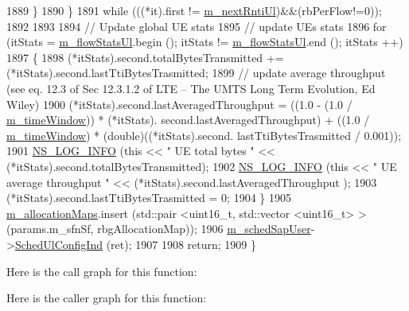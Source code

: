 \begin{DoxyCode}
1889         \}
1890     \}
1891   \textcolor{keywordflow}{while} (((*it).first != \hyperlink{classns3_1_1PfFfMacScheduler_ad4bed67ae396b364734c2cc0acc7e2ec}{m\_nextRntiUl})&&(rbPerFlow!=0));
1892 
1893 
1894   \textcolor{comment}{// Update global UE stats}
1895   \textcolor{comment}{// update UEs stats}
1896   \textcolor{keywordflow}{for} (itStats = \hyperlink{classns3_1_1PfFfMacScheduler_a1c3919a5dcda7ca29e667e2bca774ca5}{m\_flowStatsUl}.begin (); itStats != \hyperlink{classns3_1_1PfFfMacScheduler_a1c3919a5dcda7ca29e667e2bca774ca5}{m\_flowStatsUl}.end (); itStats
      ++)
1897     \{
1898       (*itStats).second.totalBytesTransmitted += (*itStats).second.lastTtiBytesTrasmitted;
1899       \textcolor{comment}{// update average throughput (see eq. 12.3 of Sec 12.3.1.2 of LTE – The UMTS Long Term Evolution, Ed
       Wiley)}
1900       (*itStats).second.lastAveragedThroughput = ((1.0 - (1.0 / \hyperlink{classns3_1_1PfFfMacScheduler_aaa362a4608a53cc70f16fdfedf221bd4}{m\_timeWindow})) * (*itStats).
      second.lastAveragedThroughput) + ((1.0 / \hyperlink{classns3_1_1PfFfMacScheduler_aaa362a4608a53cc70f16fdfedf221bd4}{m\_timeWindow}) * (double)((*itStats).second.
      lastTtiBytesTrasmitted / 0.001));
1901       \hyperlink{group__logging_gafbd73ee2cf9f26b319f49086d8e860fb}{NS\_LOG\_INFO} (\textcolor{keyword}{this} << \textcolor{stringliteral}{" UE total bytes "} << (*itStats).second.totalBytesTransmitted);
1902       \hyperlink{group__logging_gafbd73ee2cf9f26b319f49086d8e860fb}{NS\_LOG\_INFO} (\textcolor{keyword}{this} << \textcolor{stringliteral}{" UE average throughput "} << (*itStats).second.lastAveragedThroughput
      );
1903       (*itStats).second.lastTtiBytesTrasmitted = 0;
1904     \}
1905   \hyperlink{classns3_1_1PfFfMacScheduler_a372b18540784762ebc10292caf8ca40f}{m\_allocationMaps}.insert (std::pair <uint16\_t, std::vector <uint16\_t> > (params.m\_sfnSf, 
      rbgAllocationMap));
1906   \hyperlink{classns3_1_1PfFfMacScheduler_a16d9c49b69668f9343e9e7409179b8ae}{m\_schedSapUser}->\hyperlink{classns3_1_1FfMacSchedSapUser_a1b89636256701a84d990db7db8aea874}{SchedUlConfigInd} (ret);
1907 
1908   \textcolor{keywordflow}{return};
1909 \}
\end{DoxyCode}


Here is the call graph for this function\+:




Here is the caller graph for this function\+:


